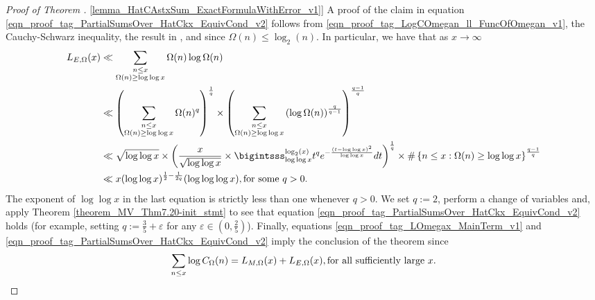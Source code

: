 \documentclass[11pt,reqno,a4letter]{article}
\newcommand{\hlocalref}[1]{\hyperref[#1]{\ref{#1}}}
\numberwithin{equation}{section}
\numberwithin{figure}{section}
\numberwithin{table}{section}
\theoremstyle{plain}
\numberwithin{theorem}{section}
\theoremstyle{definition}
\theoremstyle{remark}
\newcommand{\mathtext}[1]{\text{\rm #1}}
\begin{document}
\begin{proof}[Proof of Theorem \hlocalref{lemma_HatCAstxSum_ExactFormulaWithError_v1}]
A proof of the claim in 
equation \eqref{eqn_proof_tag_PartialSumsOver_HatCkx_EquivCond_v2} follows from 
\eqref{eqn_proof_tag_LogCOmegan_ll_FuncOfOmegan_v1}, 
the Cauchy-Schwarz inequality, 
the result in \cite[Thm.~7.21; \S 7.4]{MV}, and 
since $\Omega(n) \leq \log_2(n)$. 
In particular, we have that as $x \rightarrow \infty$ 
\begin{align*}
L_{E,\Omega}(x) & \ll \sum_{\substack{n \leq x \\ \Omega(n) \geq \log\log x}} 
	\Omega(n) \log \Omega(n) \\ 
	& \ll \left(\sum_{\substack{n \leq x \\ \Omega(n) \geq \log\log x}} 
	\Omega(n)^q\right)^{\frac{1}{q}} \times 
	\left(\sum_{\substack{n \leq x \\ \Omega(n) \geq \log\log x}} 
     \left(\log \Omega(n)\right)^{\frac{q}{q-1}}\right)^{\frac{q-1}{q}} \\ 
	& \ll \sqrt{\log\log x} \times 
	\left(\frac{x}{\sqrt{\log\log x}} \times \bigintsss_{\log\log x}^{\log_2(x)} t^q 
	e^{-\frac{\left(t-\log\log x\right)^2}{\log\log x}} dt\right)^{\frac{1}{q}} \times 
	\#\left\{n \leq x: \Omega(n) \geq \log\log x\right\}^{\frac{q-1}{q}} \\ 
     & \ll x (\log\log x)^{\frac{1}{2} - \frac{1}{2q}} (\log\log\log x), 
     \mathtext{ for some $q > 0$. }
\end{align*} 
The exponent of $\log\log x$ in the last equation is strictly less than one 
whenever $q > 0$. 
We set $q := 2$, perform a change of variables and, 
apply Theorem \hlocalref{theorem_MV_Thm7.20-init_stmt} to see that 
equation \eqref{eqn_proof_tag_PartialSumsOver_HatCkx_EquivCond_v2} holds 
(for example, setting $q := \frac{3}{5} + \varepsilon$ for any $\varepsilon \in \left(0, \frac{2}{5}\right)$). 
Finally, equations \eqref{eqn_proof_tag_LOmegax_MainTerm_v1} and 
\eqref{eqn_proof_tag_PartialSumsOver_HatCkx_EquivCond_v2} 
imply the conclusion of the theorem since 
\[
\sum_{n \leq x} \log C_{\Omega}(n) = L_{M,\Omega}(x) + L_{E,\Omega}(x), 
        \mathtext{ for all sufficiently large } x. 
	\qedhere
\]
\end{proof} 
\end{document}
